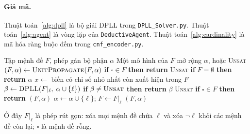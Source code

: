 \paragraph{Giả mã.}
Thuật toán~\ref{alg:dpll} là bộ giải DPLL \cite{davis1962dpll} trong
\texttt{DPLL\_Solver.py}. Thuật toán~\ref{alg:agent} là vòng lặp của
\texttt{DeductiveAgent}. Thuật toán~\ref{alg:cardinality} là mã hóa ràng buộc
đếm trong \texttt{cnf\_encoder.py}.

\begin{algorithm}[htbp]
  \caption{Bộ giải DPLL với lan truyền đơn vị}
  \label{alg:dpll}
  \begin{algorithmic}[1]
    \Require Tập mệnh đề $F$, phép gán bộ phận $\alpha$
    \Ensure Một mô hình của $F$ mở rộng $\alpha$, hoặc \textsc{Unsat}
      \State $(F, \alpha) \gets \Call{UnitPropagate}{F, \alpha}$
      \State \textbf{if} $\square \in F$ \textbf{then return} \textsc{Unsat}
      \State \textbf{if} $F = \emptyset$ \textbf{then return} $\alpha$
      \State $x \gets$ biến có chỉ số nhỏ nhất còn xuất hiện trong $F$
        \State $\beta \gets \Call{DPLL}{F|_{\ell},\; \alpha \cup \{\ell\}}$
        \State \textbf{if} $\beta \ne \textsc{Unsat}$ \textbf{then return} $\beta$
      \EndFor
      \State \Return \textsc{Unsat}
    \EndFunction
    \Statex
        \State \textbf{if} $\square \in F$ \textbf{then return} $(F, \alpha)$
        \State $\alpha \gets \alpha \cup \{\ell\}$; \quad $F \gets F|_{\ell}$
      \EndWhile
      \State \Return $(F, \alpha)$
    \EndFunction
  \end{algorithmic}
\end{algorithm}

Ở đây $F|_{\ell}$ là phép rút gọn: xóa mọi mệnh đề chứa $\ell$ và xóa
$\neg\ell$ khỏi các mệnh đề còn lại; $\square$ là mệnh đề rỗng.

